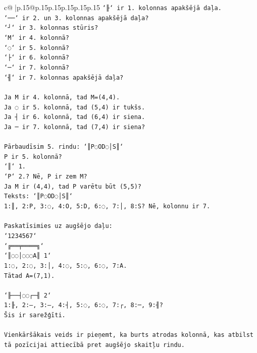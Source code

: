 \documentclass{article}
\begin{document}
{\begin{supertabular}{c@{$\;$}|p{.15\linewidth}@{}p{.15\linewidth}p{.15\linewidth}p{.15\linewidth}p{.15\linewidth}p{.15\linewidth}}
{{{\texttt{`╟` ir 1. kolonnas apakšējā daļa.} \\
\texttt{`──` ir 2. un 3. kolonnas apakšējā daļa?} \\
\texttt{`┘` ir 3. kolonnas stūris?} \\
\texttt{`M` ir 4. kolonnā?} \\
\texttt{`◌` ir 5. kolonnā?} \\
\texttt{`├` ir 6. kolonnā?} \\
\texttt{`─` ir 7. kolonnā?} \\
\texttt{`╢` ir 7. kolonnas apakšējā daļa?} \\
\\ 
\texttt{Ja M ir 4. kolonnā, tad M=(4,4).} \\
\texttt{Ja ◌ ir 5. kolonnā, tad (5,4) ir tukšs.} \\
\texttt{Ja ┤ ir 6. kolonnā, tad (6,4) ir siena.} \\
\texttt{Ja ─ ir 7. kolonnā, tad (7,4) ir siena?} \\
\\ 
\texttt{Pārbaudīsim 5. rindu: `║P◌OD◌│S║`} \\
\texttt{P ir 5. kolonnā?} \\
\texttt{`║` 1.} \\
\texttt{`P` 2.? Nē, P ir zem M?} \\
\texttt{Ja M ir (4,4), tad P varētu būt (5,5)?} \\
\texttt{Teksts: `║P◌OD◌│S║`} \\
\texttt{1:║, 2:P, 3:◌, 4:O, 5:D, 6:◌, 7:│, 8:S? Nē, kolonnu ir 7.} \\
\\ 
\texttt{Paskatīsimies uz augšējo daļu:} \\
\texttt{`1234567`} \\
\texttt{`╔══╤════╗`} \\
\texttt{`║◌◌│◌◌◌A║ 1`} \\
\texttt{1:◌, 2:◌, 3:│, 4:◌, 5:◌, 6:◌, 7:A.} \\
\texttt{Tātad A=(7,1).} \\
\\ 
\texttt{`╟──┤◌◌┌─╢ 2`} \\
\texttt{1:╟, 2:–, 3:–, 4:┤, 5:◌, 6:◌, 7:┌, 8:─, 9:╢?} \\
\texttt{Šis ir sarežģīti.} \\
\\ 
\texttt{Vienkāršākais veids ir pieņemt, ka burts atrodas kolonnā, kas atbilst tā pozīcijai attiecībā pret augšējo skaitļu rindu.} \\
}}}
\end{supertabular}}
\end{document}
